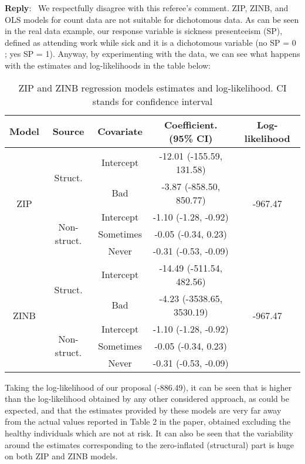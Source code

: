 \documentclass[11pt]{article}
\newenvironment{reply}
   {\medskip \noindent \begin{sf}\textbf{Reply}:\  }
   {\medskip \end{sf}}
\begin{document}
\begin{reply}
We respectfully disagree with this referee's comment. ZIP, ZINB, and OLS models for count data are not suitable for dichotomous data. As can be seen in the real data example, our response variable is sickness presenteeism (SP), defined as attending work while sick and it is a dichotomous variable (no SP = 0 ; yes SP = 1). Anyway, by experimenting with the data, we can see what happens with the estimates and log-likelihoods in the table below:

\begin{table}[h!]
\small\sf\centering
\caption{ZIP and ZINB regression models estimates and log-likelihood. CI stands for confidence interval\label{tab2}}
\begin{tabular}{ccccc}
\hline
 Model & Source & Covariate & Coefficient. (95\% CI) & Log-likelihood \\
\hline
\multirow{5}{*}{ZIP} & \multirow{2}{*}{Struct.} & Intercept & -12.01 (-155.59, 131.58) & \multirow{5}{*}{-967.47}\\
& & Bad & -3.87 (-858.50, 850.77) \\
\cline{2-4}
& \multirow{3}{*}{Non-struct.} & Intercept & -1.10 (-1.28, -0.92) \\
& & Sometimes & -0.05 (-0.34, 0.23) \\
& & Never & -0.31 (-0.53, -0.09) \\
\hline
\multirow{5}{*}{ZINB} & \multirow{2}{*}{Struct.} & Intercept & -14.49 (-511.54, 482.56) & \multirow{5}{*}{-967.47}\\
& & Bad & -4.23 (-3538.65, 3530.19) \\
\cline{2-4}
& \multirow{3}{*}{Non-struct.} & Intercept & -1.10 (-1.28, -0.92) \\
& & Sometimes & -0.05 (-0.34, 0.23) \\
& & Never & -0.31 (-0.53, -0.09) \\
\hline
\end{tabular}
\end{table}

Taking the log-likelihood of our proposal (-886.49), it can be seen that is higher than the log-likelihood obtained by any other considered approach, as could be expected, and that the estimates provided by these models are very far away from the actual values reported in Table 2 in the paper, obtained excluding the healthy individuals which are not at risk. It can also be seen that the variability around the estimates corresponding to the zero-inflated (structural) part is huge on both ZIP and ZINB models.

\end{reply}
\end{document}
